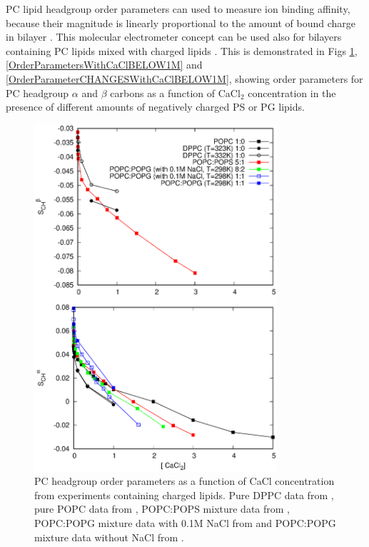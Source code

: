 \documentclass[aps,prl,superscriptaddress,twocolumn]{revtex4}
\begin{document}
PC lipid headgroup order parameters can used to measure ion binding
affinity, because their magnitude is linearly proportional
to the amount of bound charge in bilayer \cite{seelig87,catte16}.
This molecular electrometer concept can be used also
for bilayers containing PC lipids mixed with charged lipids \cite{borle85,macdonald87,roux90}.
This is demonstrated in Figs \ref{OrderParametersWithCaCl},
\ref{OrderParametersWithCaClBELOW1M} and \ref{OrderParameterCHANGESWithCaClBELOW1M},
showing order parameters for PC headgroup $\alpha$ and $\beta$ carbons
as a function of CaCl$_2$ concentration in the presence of different amounts of
negatively charged PS or PG lipids.
\begin{figure}[]
  \centering
  \includegraphics[width=9.0cm]{../Figs/LIPIDSwithCaCl.eps}
  \caption{\label{OrderParametersWithCaCl}
    PC headgroup order parameters as a function of CaCl concentration from experiments containing charged lipids.
    Pure DPPC data from \cite{akutsu81}, pure POPC data from \cite{altenbach84}, 
    POPC:POPS mixture data from \cite{roux90}, POPC:POPG mixture data with 0.1M NaCl from \cite{macdonald87}
    and POPC:POPG mixture data without NaCl from \cite{borle85}.
  }
\end{figure}
\end{document}
